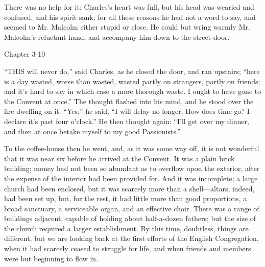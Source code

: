 There was no help for it; Charles's heart was full, but his head
was wearied and confused, and his spirit sank; for all these reasons
he had not a word to say, and seemed to Mr. Malcolm either stupid or
close. He could but wring warmly Mr. Malcolm's reluctant hand, and
accompany him down to the street-door.

Chapter 3-10


``THIS will never do,'' said Charles,
as he closed the door, and ran upstairs; ``here is a day wasted,
worse than wasted, wasted partly on strangers, partly on friends; and
it's hard to say in which case a more thorough waste. I ought to have
gone to the Convent at once.'' The thought flashed into his mind,
and he stood over the fire dwelling on it. ``Yes,'' he said,
``I will delay no longer. How does time go? I declare it's past
four o'clock.'' He then thought again: ``I'll get over my
dinner, and then at once betake myself to my good Passionists.''

To the coffee-house then he went, and, as it was some way off, it
is not wonderful that it was near six before he arrived at the
Convent. It was a plain brick building; money had not been so abundant
as to overflow upon the exterior, after the expense of the interior
had been provided for. And it was incomplete; a large church had been
enclosed, but it was scarcely more than a shell—altars, indeed, had
been set up, but, for the rest, it had little more than good
proportions, a broad sanctuary, a serviceable organ, and an effective
choir. There was a range of buildings adjacent, capable of
holding about half-a-dozen fathers; but the size of the church
required a larger establishment. By this time, doubtless, things are
different, but we are looking back at the first efforts of the English
Congregation, when it had scarcely ceased to struggle for life, and
when friends and members were but beginning to flow in.

